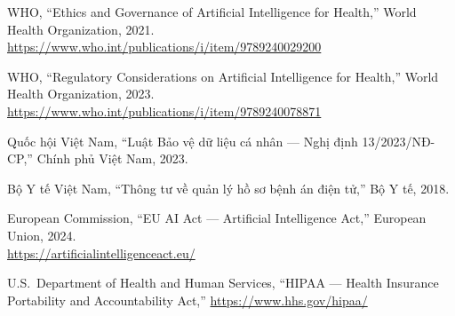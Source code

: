 \documentclass[12pt,a4paper]{article}
\begin{document}
\begin{enumerate}[label={[E\arabic*]}]

\item WHO, ``Ethics and Governance of Artificial Intelligence for Health,''
World Health Organization, 2021.\\
\url{https://www.who.int/publications/i/item/9789240029200}

\item WHO, ``Regulatory Considerations on Artificial Intelligence for Health,''
World Health Organization, 2023.\\
\url{https://www.who.int/publications/i/item/9789240078871}

\item Quốc hội Việt Nam, ``Luật Bảo vệ dữ liệu cá nhân --- Nghị định 13/2023/NĐ-CP,''
Chính phủ Việt Nam, 2023.

\item Bộ Y tế Việt Nam, ``Thông tư về quản lý hồ sơ bệnh án điện tử,''
Bộ Y tế, 2018.

\item European Commission, ``EU AI Act --- Artificial Intelligence Act,''
European Union, 2024.\\
\url{https://artificialintelligenceact.eu/}

\item U.S.~Department of Health and Human Services,
``HIPAA --- Health Insurance Portability and Accountability Act,''
\url{https://www.hhs.gov/hipaa/}

\end{enumerate}
\end{document}

